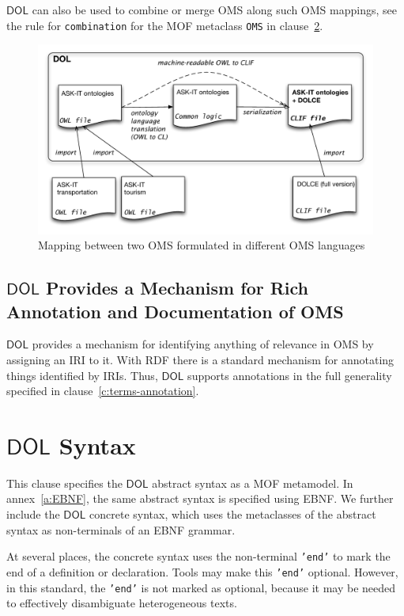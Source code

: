 \documentclass[10pt,fleqn,final]{scrreprt}
\newcommand{\cbs}[0]{\color{red}\xspace} %
\newcommand{\cbe}[0]{\color{black}\xspace} %
\newcommand*{\syntax}[1]{\texttt{#1}}
\newcommand*{\DOL}{\ensuremath{\mathsf{DOL}}\xspace}
\newcommand{\clauserefname}{clause}
\newcommand{\cref}[1]{\clauserefname~\ref{#1}}
\newcommand{\clause}[1]{\chapter{#1}}
\newenvironment{definitions}[0]{\medskip }{}
\begin{document}
\begin{definitions}
\DOL can also be used to combine or merge OMS along such OMS mappings, see
the rule for \syntax{combination} for the \cbs MOF metaclass \cbe 
\syntax{OMS} in clause~\ref{c:abstract-syntax}.

\begin{figure}
  \centering
  \includegraphics[width=\textwidth]{illustrations/DOLfig.pdf}
  \caption{Mapping between two OMS formulated in different OMS languages}
\label{f:DOL-mapping}
\end{figure}



\section{\DOL Provides a Mechanism for Rich Annotation and Documentation of OMS}\label{c:req:annotation}

\DOL provides a mechanism for identifying anything of relevance in OMS by assigning an IRI to it.  With RDF there is a standard mechanism for annotating things identified by IRIs.  Thus, \DOL supports  annotations in the full generality specified in \cref{c:terms-annotation}.




\clause{\DOL  Syntax}\label{c:abstract-syntax}%

\cbs
This clause specifies the \DOL abstract syntax as a MOF metamodel.
In annex~\ref{a:EBNF}, the same abstract syntax is specified using EBNF.
We further include  the \DOL concrete syntax, which
uses the metaclasses of the abstract syntax as non-terminals of
an EBNF grammar.


At several places, the concrete syntax uses the non-terminal
\syntax{'end'} to mark the end of a definition or declaration. Tools
may make this \syntax{'end'} optional. However, in this standard,\cbs
the \syntax{'end'} is not marked as optional,\cbe because it may be needed to effectively
disambiguate heterogeneous texts.
\cbe


\end{definitions}
\end{document}
